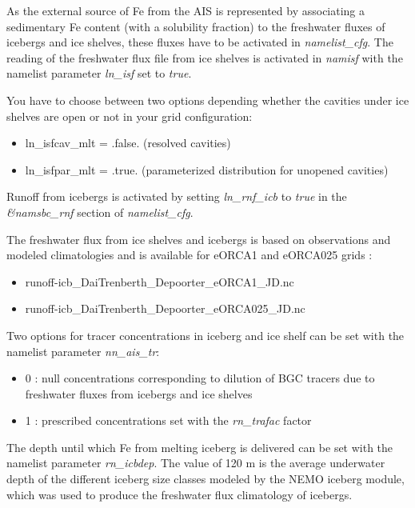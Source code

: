 \documentclass[../main/TOP_manual]{subfiles}
\begin{document}
As the external source of Fe from the AIS is represented by associating  a sedimentary Fe content (with a solubility fraction) to the freshwater fluxes of icebergs and ice shelves, these fluxes have to be activated in \textit{namelist\_cfg}. The reading of the freshwater flux file from ice shelves is activated in \textit{namisf} with the namelist parameter \textit{ln\_isf} set to \textit{true}.

You have to choose between two options depending whether the cavities under ice shelves are open or not in your grid configuration:
\begin{itemize}
	\item ln\_isfcav\_mlt = .false. (resolved cavities)
	\item ln\_isfpar\_mlt = .true. (parameterized distribution for unopened cavities)
\end{itemize}


Runoff from icebergs is activated by setting \textit{ln\_rnf\_icb} to \textit{true} in the \textit{\&namsbc\_rnf} section of \textit{namelist\_cfg}.


The freshwater flux from ice shelves and icebergs is based on observations and modeled climatologies and is available for eORCA1 and eORCA025 grids :
\begin{itemize}
	\item runoff-icb\_DaiTrenberth\_Depoorter\_eORCA1\_JD.nc
	\item runoff-icb\_DaiTrenberth\_Depoorter\_eORCA025\_JD.nc 
\end{itemize}


Two options for tracer concentrations in iceberg and ice shelf can be set with the namelist parameter \textit{nn\_ais\_tr}:
\begin{itemize}
	\item 0 : null concentrations corresponding to dilution of BGC tracers due to freshwater fluxes from icebergs and ice shelves
	\item 1 : prescribed concentrations set with the \textit{rn\_trafac} factor
\end{itemize}

The depth until which Fe from melting iceberg is delivered can be set with the namelist parameter \textit{rn\_icbdep}. The value of 120 m is the average underwater depth of the different iceberg size classes modeled by the NEMO iceberg module, which was used to produce the freshwater flux climatology of icebergs.
\end{document}
